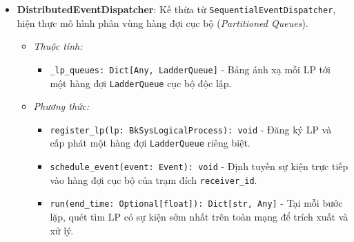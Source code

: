 \begin{itemize}[leftmargin=1.5em, itemsep=8pt]
\begin{itemize}[leftmargin=1.2em, label={}, itemsep=3pt]
\item[\textendash] \textit{Phương thức:}
\begin{itemize}[leftmargin=1.5em, label=+, itemsep=2pt]
\item \texttt{register\_lp(lp: BkSysLogicalProcess): void} - Đăng ký tiến trình logic vào danh bạ và liên kết Dispatcher.
\item \texttt{get\_lp(lp\_id: Any): Optional[BkSysLogicalProcess]} - Tra cứu trạm logic theo định danh.
\item \texttt{get\_all\_lps(): List[BkSysLogicalProcess]} - Lấy toàn bộ danh sách trạm logic đã đăng ký.
\item \texttt{schedule\_event(event: Event): void} - Đẩy sự kiện mới vào hàng đợi sự kiện ưu tiên.
\item \texttt{schedule\_initial\_events(): void} - Duyệt toàn bộ LPs và kích hoạt phương thức \texttt{initialize()} mồi sự kiện đầu tiên.
\item \texttt{run(end\_time: Optional[float]): Dict[str, Any]} - Thực thi vòng lặp DES chính cho đến khi đạt \texttt{end\_time} hoặc hàng đợi rỗng.
\end{itemize}
\end{itemize}

\item \textbf{DistributedEventDispatcher}: Kế thừa từ \texttt{SequentialEventDispatcher}, hiện thực mô hình phân vùng hàng đợi cục bộ (\textit{Partitioned Queues}).

\begin{itemize}[leftmargin=1.2em, label={}, itemsep=3pt]
\item[\textendash] \textit{Thuộc tính:}
\begin{itemize}[leftmargin=1.5em, label=+, itemsep=2pt]
\item \texttt{\_lp\_queues: Dict[Any, LadderQueue]} - Bảng ánh xạ mỗi LP tới một hàng đợi \texttt{LadderQueue} cục bộ độc lập.
\end{itemize}

\item[\textendash] \textit{Phương thức:}
\begin{itemize}[leftmargin=1.5em, label=+, itemsep=2pt]
\item \texttt{register\_lp(lp: BkSysLogicalProcess): void} - Đăng ký LP và cấp phát một hàng đợi \texttt{LadderQueue} riêng biệt.
\item \texttt{schedule\_event(event: Event): void} - Định tuyến sự kiện trực tiếp vào hàng đợi cục bộ của trạm đích \texttt{receiver\_id}.
\item \texttt{run(end\_time: Optional[float]): Dict[str, Any]} - Tại mỗi bước lặp, quét tìm LP có sự kiện sớm nhất trên toàn mạng để trích xuất và xử lý.
\end{itemize}
\end{itemize}


\end{itemize}
